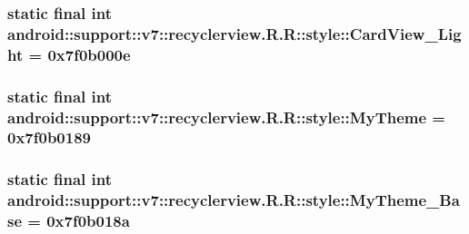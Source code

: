 \hypertarget{classandroid_1_1support_1_1v7_1_1recyclerview_1_1_r_1_1style_ff618bcdefa5416808319482309dbd02}{
\subsubsection[{CardView\_\-Light}]{\setlength{\rightskip}{0pt plus 5cm}static final int android::support::v7::recyclerview.R.R::style::CardView\_\-Light = 0x7f0b000e}}
\label{classandroid_1_1support_1_1v7_1_1recyclerview_1_1_r_1_1style_ff618bcdefa5416808319482309dbd02}


\hypertarget{classandroid_1_1support_1_1v7_1_1recyclerview_1_1_r_1_1style_89217811b804609599e2916869b2fa82}{
\subsubsection[{MyTheme}]{\setlength{\rightskip}{0pt plus 5cm}static final int android::support::v7::recyclerview.R.R::style::MyTheme = 0x7f0b0189}}
\label{classandroid_1_1support_1_1v7_1_1recyclerview_1_1_r_1_1style_89217811b804609599e2916869b2fa82}


\hypertarget{classandroid_1_1support_1_1v7_1_1recyclerview_1_1_r_1_1style_c56b0169e6e8a283107b93c776927c10}{
\subsubsection[{MyTheme\_\-Base}]{\setlength{\rightskip}{0pt plus 5cm}static final int android::support::v7::recyclerview.R.R::style::MyTheme\_\-Base = 0x7f0b018a}}
\label{classandroid_1_1support_1_1v7_1_1recyclerview_1_1_r_1_1style_c56b0169e6e8a283107b93c776927c10}


